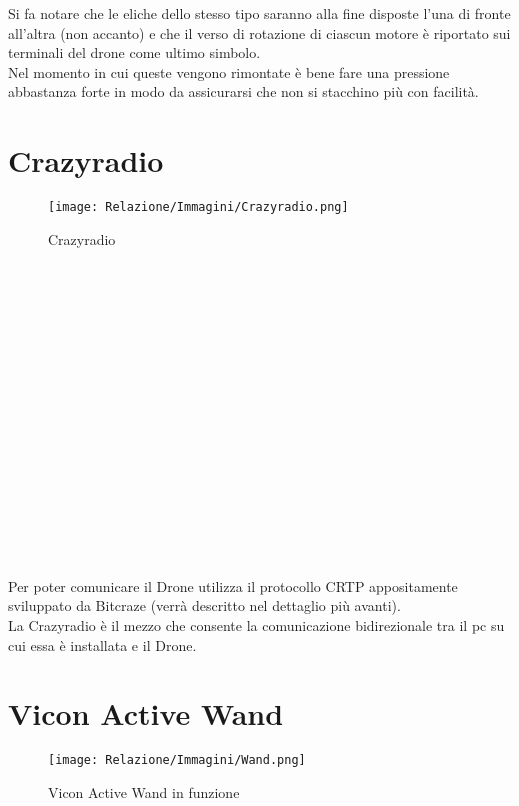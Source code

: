 Si fa notare che le eliche dello stesso tipo saranno alla fine disposte l’una di fronte all’altra (non accanto) e che il verso di rotazione di ciascun motore è riportato sui terminali del drone come ultimo simbolo. \\ 
Nel momento in cui queste vengono rimontate è bene fare una pressione abbastanza forte in modo da assicurarsi che non si stacchino più con facilità. 

\section*{Crazyradio}


\begin{figure}[h]
    \centering
    \texttt{[image: Relazione/Immagini/Crazyradio.png]}
    \caption{Crazyradio}
    \label{fig:Crazyradio}
\end{figure}
\\
\\
\\
\\
\\
\\
\\
\\
\\
\\
\\
\\
\\
\\
\\
\\


Per poter comunicare il Drone utilizza il protocollo CRTP appositamente sviluppato da Bitcraze (verrà descritto nel dettaglio più avanti). \\ 
La Crazyradio è il mezzo che consente la comunicazione bidirezionale tra il pc su cui essa è installata e il Drone. 

\section*{Vicon Active Wand}

\begin{figure}[h]
    \centering
    \texttt{[image: Relazione/Immagini/Wand.png]}
    \caption{Vicon Active Wand in funzione}
    \label{fig:Wand}
\end{figure}

